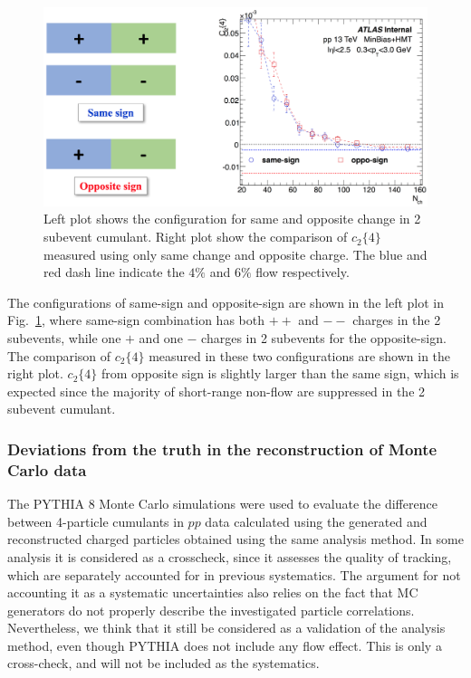 \begin{figure}[H]
\centering
\includegraphics[width=0.8\linewidth]{figs/sec_sys/pp13/charge_dependence_2sub.png}
\caption{Left plot shows the configuration for same and opposite change in 2 subevent cumulant. Right plot show the comparison of $c_{2}\{4\}$ measured using only same change and opposite charge. The blue and red dash line indicate the $4\%$ and $6\%$ flow respectively.}
\label{fig:charge_dependence_2sub}
\end{figure}
The configurations of same-sign and opposite-sign are shown in the left plot in Fig.~\ref{fig:charge_dependence_2sub}, where same-sign combination has both $++$ and $--$ charges in the 2 subevents, while one $+$ and one $-$ charges in 2 subevents for the opposite-sign. The comparison of $c_{2}\{4\}$ measured in these two configurations are shown in the right plot. $c_{2}\{4\}$ from opposite sign is slightly larger than the same sign, which is expected since the majority of short-range non-flow are suppressed in the 2 subevent cumulant.



\subsubsection{Deviations from the truth in the reconstruction of Monte Carlo data}
The PYTHIA 8 Monte Carlo simulations were used to evaluate the difference between 4-particle cumulants in $pp$ data calculated using the generated and reconstructed charged particles obtained using the same analysis method. In some analysis it is considered as a crosscheck, since it assesses the quality of tracking, which are separately accounted for in previous systematics. The argument for not accounting it as a systematic uncertainties also relies on the fact that MC generators do not properly describe the investigated particle correlations. Nevertheless, we think that it still be considered as a validation of the analysis method, even though PYTHIA does not include any flow effect. This is only a cross-check, and will not be included as the systematics.

